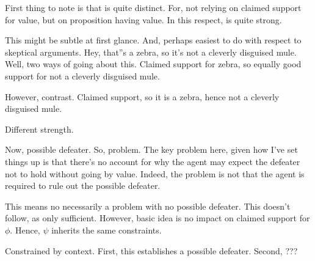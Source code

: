 \begin{note}
  First thing to note is that \RBV{} is quite distinct.
  For, not relying on claimed support for value, but on proposition having value.
  In this respect, \RBV{} is quite strong.

  This might be subtle at first glance.
  And, perhaps easiest to do with respect to skeptical arguments.
  Hey, that''s a zebra, so it's not a cleverly disguised mule.
  Well, two ways of going about this.
  Claimed support for zebra, so equally good support for not a cleverly disguised mule.

  However, contrast.
  Claimed support, so it is a zebra, hence not a cleverly disguised mule.

  Different strength.

  Now, possible defeater.
  So, problem.
  The key problem here, given how I've set things up is that there's no account for why the agent may expect the defeater not to hold without going by value.
  Indeed, the problem is not that the agent is required to rule out the possible defeater.

  This means no necessarily a problem with no possible defeater.
  This doesn't follow, as only sufficient.
  However, basic idea is no impact on claimed support for \(\phi\).
  Hence, \(\psi\) inherits the same constraints.

  Constrained by context.
  First, this establishes a possible defeater.
  Second, ???
\end{note}

